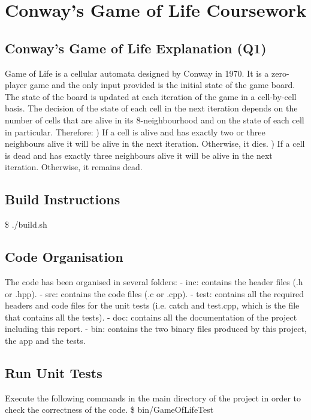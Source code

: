 \documentclass[a4paper,12pt,twoside]{report}
\author{Luis Carlos Garcia-Peraza Herrera}
\date{\today}
\begin{document}
\chapter*{Conway's Game of Life Coursework}
\section*{Conway's Game of Life Explanation (Q1)}
	
Game of Life is a cellular automata designed by Conway in 1970. It is a zero-player game and the only input provided is the initial state of the game board.
The state of the board is updated at each iteration of the game in a cell-by-cell basis. The decision of the state of each cell in the next iteration depends
on the number of cells that are alive in its 8-neighbourhood and on the state of each cell in particular. Therefore:
\newline{}) If a cell is alive and has exactly two or three neighbours alive it will be alive in the next iteration. Otherwise, it dies.
\newline{}) If a cell is dead and has exactly three neighbours alive it will be alive in the next iteration. Otherwise, it remains dead.

\section*{Build Instructions}
\$ ./build.sh
\section*{Code Organisation}
The code has been organised in several folders: \newline
- inc: contains the header files (.h or .hpp). \newline
- src: contains the code files (.c or .cpp). \newline
- test: contains all the required headers and code files for the unit tests (i.e. catch and test.cpp, which is the file that contains all the tests). \newline
- doc: contains all the documentation of the project including this report. \newline
- bin: contains the two binary files produced by this project, the app and the tests.
\section*{Run Unit Tests}
Execute the following commands in the main directory of the project in order to check the correctness of the code. \newline
\newline
\$ bin/GameOfLifeTest
\end{document}
